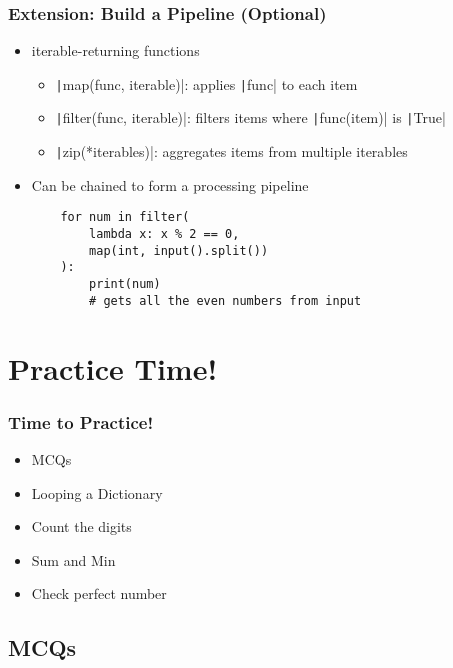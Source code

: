 \documentclass{beamer}
\begin{document}
\begin{frame}[fragile]
    \frametitle{Extension: Build a Pipeline (Optional)}
    \begin{itemize}
        \item iterable-returning functions
              \begin{itemize}
                  \item \texttt|map(func, iterable)|: applies \texttt|func| to each item
                  \item \texttt|filter(func, iterable)|: filters items where \texttt|func(item)| is \texttt|True|
                  \item \texttt|zip(*iterables)|: aggregates items from multiple iterables
              \end{itemize}
        \item Can be chained to form a processing pipeline
              \begin{verbatim}
    for num in filter(
        lambda x: x % 2 == 0, 
        map(int, input().split())
    ):
        print(num)
        # gets all the even numbers from input
              \end{verbatim}
    \end{itemize}
\end{frame}


\section{Practice Time!}

\begin{frame}
    \frametitle{Time to Practice!}
    \begin{itemize}
        \item MCQs
        \item Looping a Dictionary
        \item Count the digits
        \item Sum and Min
        \item Check perfect number
    \end{itemize}
\end{frame}


\subsection{MCQs}
\end{document}
